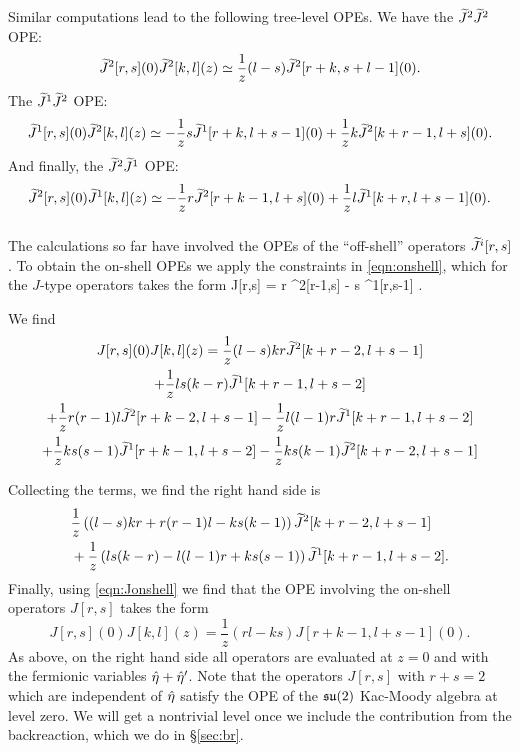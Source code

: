 \documentclass[../main.tex]{subfiles}
\begin{document}
\subsubsection{}

Similar computations lead to the following tree-level OPEs.
We have the $\widetilde{J}^2 \widetilde{J}^2$ OPE:
\[ 
		\widetilde{J}^2[r,s](0)  \widetilde{J}^2[k,l](z)
	\simeq \frac{1}{z} (l-s)  \widetilde{J}^2 [r+k,s+l-1] (0) . 
\]
The $\widetilde{J}^1 \widetilde{J}^2$ OPE:
\[ 
	\widetilde{J}^1[r,s] (0) \widetilde{J}^2[k,l](z) \simeq - \frac{1}{z} s  \widetilde{J}^1[r+k, l+s - 1] (0) + \frac{1}{z} k \widetilde{J}^2[k+r-1,l+s] (0).
\]
And finally, the $\widetilde{J}^2 \widetilde{J}^1$ OPE:
\[ 
	\widetilde{J}^2[r,s] (0) \widetilde{J}^1[k,l](z) \simeq - \frac{1}{z} r  \widetilde{J}^2[r+k-1, l+s ] (0)    + \frac{1}{z} l \widetilde{J}^1[k+r,l+s-1] (0).   
\]

\subsubsection{}


The calculations so far have involved the OPEs of the ``off-shell'' operators $\widetilde{J}^i[r,s]$.
To obtain the on-shell OPEs we apply the constraints in \eqref{eqn:onshell}, which for the $J$-type operators takes the form
\beqn\label{eqn:Jonshell}
	 	J[r,s] = r ^2[r-1,s] - s ^1[r,s-1] .
\eeqn

We find
\begin{multline}
	J[r,s] (0) J[k,l](z) =   \frac{1}{z} (l-s) k r  \widetilde{J}^2 [k+r-2,l+s-1]   \\
	+ \frac{1}{z} ls(k-r) \widetilde{J}^1[k+r-1, l+s-2] \\
	+  \frac{1}{z} r (r-1) l  \widetilde{J}^2[r+k-2, l+s -1 ]    - \frac{1}{z} l (l-1) r \widetilde{J}^1[k+r-1,l+s-2]  \\
	+ \frac{1}{z} k s(s-1)  \widetilde{J}^1[r+k-1, l+s - 2]    - \frac{1}{z}k s  (k-1) \widetilde{J}^2[k+r-2,l+s-1] 
\end{multline}

Collecting the terms, we find the right hand side is
\begin{align*} 
	&\frac{1}{z} \left( (l-s)kr + r (r-1) l - ks (k-1)     \right)  \widetilde{J}^2 [k+r - 2, l +s - 1]  \\
	&+ \frac{1}{z} \left( ls (k-r) - l (l-1) r + k s (s-1)  \right) \widetilde{J}^1 [ k + r -1, l + s - 2]. 
\end{align*}
Finally, using \eqref{eqn:Jonshell}
we find that the OPE involving the on-shell operators $J[r,s]$ takes the form 
\[ 
	J[r,s](0)J[k,l](z) = \frac{1}{z} (rl-ks)  J[r+k-1,l+s-1](0).     
\]
As above, on the right hand side all operators are evaluated at $z = 0$ and with the fermionic variables $\Hat{\eta}+\Hat{\eta}'$. 
Note that the operators $J[r,s]$ with $r + s = 2$ which are independent of $\Hat{\eta}$ satisfy the OPE of the $\mathfrak{su}(2)$ Kac-Moody algebra at level zero.
We will get a nontrivial level once we include the contribution from the backreaction, which we do in \S \ref{sec:br}.
\end{document}
